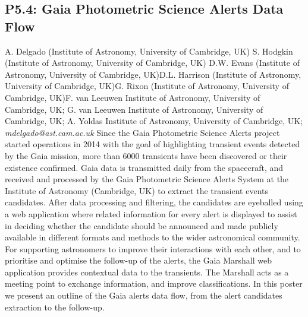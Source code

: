 \documentclass{report}
\begin{document}
\subsection*{P5.4: Gaia Photometric Science Alerts Data Flow}
\bigskip
A. Delgado (Institute of Astronomy, University of Cambridge, UK) \newline S. Hodgkin (Institute of Astronomy, University of Cambridge, UK) \newline  D.W. Evans (Institute of Astronomy, University of Cambridge, UK)\newline  D.L. Harrison (Institute of Astronomy, University of Cambridge, UK)\newline G. Rixon (Institute of Astronomy, University of Cambridge, UK)\newline  F. van Leeuwen
Institute of Astronomy, University of Cambridge, UK;
G. van Leeuwen
Institute of Astronomy, University of Cambridge, UK;
A. Yoldas
Institute of Astronomy, University of Cambridge, UK;\newline\newline
{\it mdelgado@ast.cam.ac.uk}\newline
\newline\newline
Since the Gaia Photometric Science Alerts project started operations in 2014 with the goal of highlighting transient events detected by the Gaia mission, more than 6000 transients have been discovered or their existence confirmed.
Gaia data is transmitted daily from the spacecraft, and received and processed by the Gaia Photometric Science Alerts System at the Institute of Astronomy (Cambridge, UK) to extract the transient events candidates. After data processing and filtering, the candidates are eyeballed using a web application where related information for every alert is displayed to assist in deciding whether the candidate should be announced and made publicly available in different formats and methods to the wider astronomical community. 
For supporting astronomers to improve their interactions with each other, and to prioritise and optimise the follow-up of the alerts, the Gaia Marshall web application provides contextual data to the transients. The Marshall acts as a meeting point to exchange information, and improve classifications.
In this poster we present an outline of the Gaia alerts data flow, from the alert candidates extraction to the follow-up.\newline
\newpage
\end{document}
